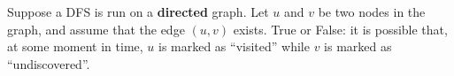\begin{prob}
    Suppose a DFS is run on a \textbf{directed} graph. Let $u$ and $v$ be two
    nodes in the graph, and assume that the edge $(u, v)$ exists. True or
    False: it is possible that, at some moment in time, $u$ is marked as
    ``visited'' while $v$ is marked as ``undiscovered''.

    \tF{}

\end{prob}
